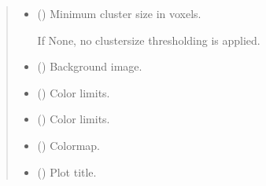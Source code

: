 \documentclass[letterpaper,10pt,english]{sphinxhowto}
\begin{document}
\begin{fulllineitems}
\begin{quote}
\begin{description}
\begin{itemize}
\item {} 
\sphinxAtStartPar
{} (\sphinxstyleliteralemphasis{\sphinxupquote{, }}) \textendash{} 
\sphinxAtStartPar
Minimum cluster size in voxels.

\sphinxAtStartPar
If None, no cluster\sphinxhyphen{}size thresholding is applied.


\item {} 
\sphinxAtStartPar
{} (\sphinxstyleliteralemphasis{\sphinxupquote{, }}\sphinxstyleliteralemphasis{\sphinxupquote{(}}\sphinxstyleliteralemphasis{\sphinxupquote{)}}) \textendash{} Background image.

\item {} 
\sphinxAtStartPar
{} (\sphinxstyleliteralemphasis{\sphinxupquote{, }}) \textendash{} Color limits.

\item {} 
\sphinxAtStartPar
{} (\sphinxstyleliteralemphasis{\sphinxupquote{, }}) \textendash{} Color limits.

\item {} 
\sphinxAtStartPar
{} (\sphinxstyleliteralemphasis{\sphinxupquote{, }}) \textendash{} Colormap.

\item {} 
\sphinxAtStartPar
{} (\sphinxstyleliteralemphasis{\sphinxupquote{, }}) \textendash{} Plot title.


\end{itemize}
\end{description}
\end{quote}
\end{fulllineitems}
\end{document}
